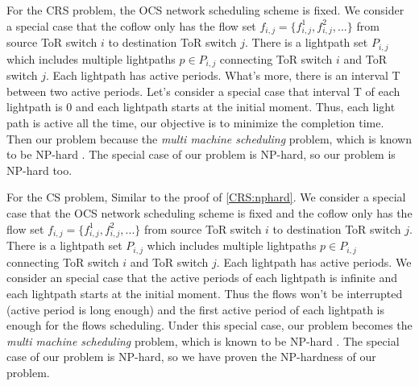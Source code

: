 
\begin{IEEEproof}
For the CRS problem, the OCS network scheduling scheme is fixed. We consider a special case that the coflow only has the flow set $f_{i,j}=\{f_{i,j}^1,f_{i,j}^2,...\}$ from source ToR switch $i$ to destination ToR switch $j$. There is a lightpath set $P_{i,j}$ which includes multiple lightpaths $p\in P_{i,j}$ connecting ToR switch $i$ and ToR switch $j$. Each lightpath has active periods. What's more, there is an interval T between two active periods. Let's consider a special case that interval T of each lightpath is 0 and each lightpath starts at the initial moment. Thus, each light path is active all the time, our objective is to minimize the completion time. Then our problem because the \emph{multi machine scheduling} problem, which is known to be NP-hard \cite{mosheiov1998multi}. The special case of our problem is NP-hard, so our problem is NP-hard too.
\end{IEEEproof}

\begin{IEEEproof}
For the CS problem, Similar to the proof of \ref{CRS:nphard}. We consider a special case that the OCS network scheduling scheme is fixed and the coflow only has the flow set $f_{i,j}=\{f_{i,j}^1,f_{i,j}^2,...\}$ from source ToR switch $i$ to destination ToR switch $j$. There is a lightpath set $P_{i,j}$ which includes multiple lightpaths $p\in P_{i,j}$ connecting ToR switch $i$ and ToR switch $j$. Each lightpath has active periods. We consider an special case that the active periods of each lightpath is infinite and each lightpath starts at the initial moment. Thus the flows won't be interrupted (active period is long enough) and the first active period of each lightpath is enough for the flows scheduling. Under this special case, our problem becomes the \emph{multi machine scheduling} problem, which is known to be NP-hard \cite{mosheiov1998multi}. The special case of our problem is NP-hard, so we have proven the NP-hardness of our problem.
\end{IEEEproof}
